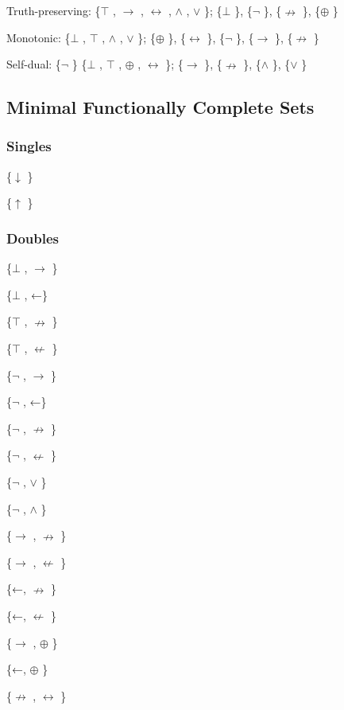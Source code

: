 Truth-preserving: \{$\top$ , $\to$ , $\leftrightarrow$ , $\land$ , $\lor$ \}; \{$\bot$ \}, \{$\neg$ \}, \{$\nrightarrow$ \}, \{$\oplus$ \}

Monotonic: \{$\bot$ , $\top$ , $\land$ , $\lor$ \}; \{$\oplus$ \}, \{$\leftrightarrow$ \}, \{$\neg$ \}, \{$\to$ \}, \{$\nrightarrow$ \}

Self-dual: \{$\neg$ \} \{$\bot$ , $\top$ , $\oplus$ , $\leftrightarrow$ \}; \{$\to$ \}, \{$\nrightarrow$ \}, \{$\land$ \}, \{$\lor$ \}

\hypertarget{minimal-functionally-complete-sets}{%
\subsection{Minimal Functionally Complete
Sets}\label{minimal-functionally-complete-sets}}

\hypertarget{singles}{%
\subsubsection{Singles}\label{singles}}

\{$\downarrow$ \}

\{$\uparrow$ \}

\hypertarget{doubles}{%
\subsubsection{Doubles}\label{doubles}}

\{$\bot$ , $\to$ \}

\{$\bot$ , ←\}

\{$\top$ , $\nrightarrow$ \}

\{$\top$ , $\nleftarrow$ \}

\{$\neg$ , $\to$ \}

\{$\neg$ , ←\}

\{$\neg$ , $\nrightarrow$ \}

\{$\neg$ , $\nleftarrow$ \}

\{$\neg$ , $\lor$ \}

\{$\neg$ , $\land$ \}

\{$\to$ , $\nrightarrow$ \}

\{$\to$ , $\nleftarrow$ \}

\{←, $\nrightarrow$ \}

\{←, $\nleftarrow$ \}

\{$\to$ , $\oplus$ \}

\{←, $\oplus$ \}

\{$\nrightarrow$ , $\leftrightarrow$ \}

